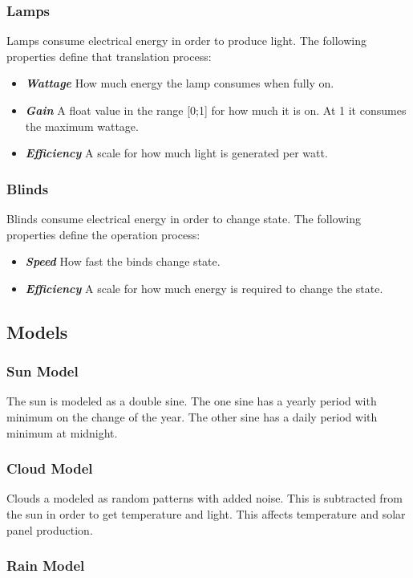 \documentclass[10pt]{article}
\newcommand{\textdesc}[1]{\textit{\textbf{#1}}} %
\newcommand{\descitem}[1]{\item \textdesc{#1}}
\begin{document}
\subsubsection{Lamps}

Lamps consume electrical energy in order to produce light. The following properties define that translation process:
\begin{itemize}
\descitem{Wattage} How much energy the lamp consumes when fully on.
\descitem{Gain} A float value in the range [0;1] for how much it is on. At 1 it consumes the maximum wattage.
\descitem{Efficiency} A scale for how much light is generated per watt.
\end{itemize}

\subsubsection{Blinds}

Blinds consume electrical energy in order to change state. The following properties define the operation process:
\begin{itemize}
\descitem{Speed} How fast the binds change state.
\descitem{Efficiency} A scale for how much energy is required to change the state.
\end{itemize}

\subsection{Models}

\subsubsection{Sun Model}
\label{sec:internals:models:sun}

The sun is modeled as a double sine. The one sine has a yearly period with minimum on the change of the year. The other sine has a daily period with minimum at midnight.

\subsubsection{Cloud Model}
\label{sec:internals:models:cloud}

Clouds a modeled as random patterns with added noise. This is subtracted from the sun in order to get temperature and light. This affects temperature and solar panel production.

\subsubsection{Rain Model}
\label{sec:internals:models:rain}
\end{document}
